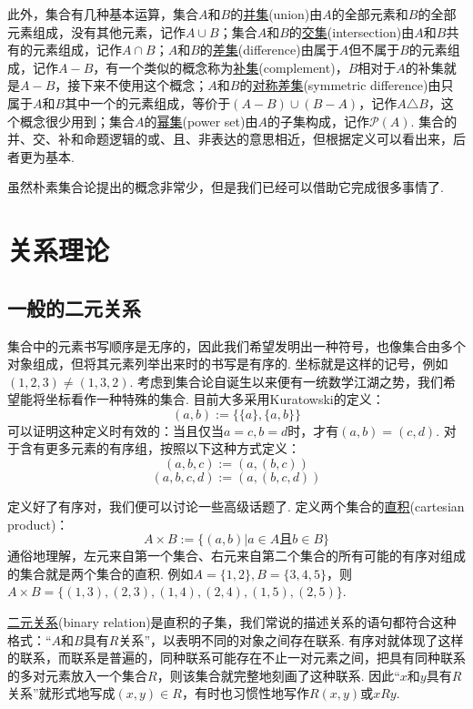 \documentclass[main.tex]{subfiles}
\begin{document}
此外，集合有几种基本运算，集合\(A\)和\(B\)的\uline{并集}(union)由\(A\)的全部元素和\(B\)的全部元素组成，没有其他元素，记作\(A \cup B\)；集合\(A\)和\(B\)的\uline{交集}(intersection)由\(A\)和\(B\)共有的元素组成，记作\(A \cap B\)；\(A\)和\(B\)的\uline{差集}(difference)由属于\(A\)但不属于\(B\)的元素组成，记作\(A-B\)，有一个类似的概念称为\uline{补集}(complement)，\(B\)相对于\(A\)的补集就是\(A-B\)，接下来不使用这个概念；\(A\)和\(B\)的\uline{对称差集}(symmetric difference)由只属于\(A\)和\(B\)其中一个的元素组成，等价于\((A-B)\cup(B-A)\)，记作\(A\triangle B\)，这个概念很少用到；集合\(A\)的\uline{幂集}(power set)由\(A\)的子集构成，记作\(\mathcal{P}(A)\). 集合的并、交、补和命题逻辑的或、且、非表达的意思相近，但根据定义可以看出来，后者更为基本.

虽然朴素集合论提出的概念非常少，但是我们已经可以借助它完成很多事情了.

\section{关系理论}

\subsection{一般的二元关系}

集合中的元素书写顺序是无序的，因此我们希望发明出一种符号，也像集合由多个对象组成，但将其元素列举出来时的书写是有序的. 坐标就是这样的记号，例如\((1,2,3)\neq(1,3,2)\). 考虑到集合论自诞生以来便有一统数学江湖之势，我们希望能将坐标看作一种特殊的集合. 目前大多采用Kuratowski的定义：
\[(a,b) := \{\{a\},\{a,b\}\}\]
可以证明这种定义时有效的：当且仅当\(a=c,b=d\)时，才有\((a,b)=(c,d)\). 对于含有更多元素的有序组，按照以下这种方式定义：
\[(a,b,c):=(a,(b,c))\]
\[(a,b,c,d):=(a,(b,c,d))\]

定义好了有序对，我们便可以讨论一些高级话题了. 定义两个集合的\uline{直积}(cartesian product)：
\[A \times B := \{(a,b) | a \in A \mbox{且} b \in B\}\]
通俗地理解，左元来自第一个集合、右元来自第二个集合的所有可能的有序对组成的集合就是两个集合的直积. 例如\(A=\{1,2\},B=\{3,4,5\}\)，则\(A\times B=\{(1,3),( 2,3),(1,4),(2,4),(1,5),(2,5)\}\).

\uline{二元关系}(binary relation)是直积的子集，我们常说的描述关系的语句都符合这种格式：“\(A\)和\(B\)具有\(R\)关系”，以表明不同的对象之间存在联系. 有序对就体现了这样的联系，而联系是普遍的，同种联系可能存在不止一对元素之间，把具有同种联系的多对元素放入一个集合\(R\)，则该集合就完整地刻画了这种联系. 因此“\(x\)和\(y\)具有\(R\)关系”就形式地写成\((x,y) \in R\)，有时也习惯性地写作\(R(x,y)\)或\(xRy\).
\end{document}
